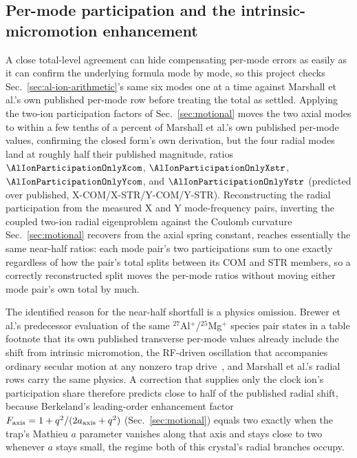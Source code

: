 \documentclass[aps,pra,superscriptaddress,groupedaddress,nofootinbib]{revtex4-2}
\begin{document}
\subsection{Per-mode participation and the intrinsic-micromotion enhancement}
\label{sec:al-ion-participation}

A close total-level agreement can hide compensating per-mode errors as
easily as it can confirm the underlying formula mode by mode, so this
project checks Sec.~\ref{sec:al-ion-arithmetic}'s same six modes one at a
time against Marshall et al.'s own published per-mode row before treating
the total as settled. Applying the two-ion participation factors of
Sec.~\ref{sec:motional} moves the two axial modes to within a few tenths of
a percent of Marshall et al.'s own published per-mode values, confirming
the closed form's own derivation, but the four radial modes land
at roughly half their published magnitude, ratios $\AlIonParticipationOnlyXcom$,
$\AlIonParticipationOnlyXstr$, $\AlIonParticipationOnlyYcom$, and
$\AlIonParticipationOnlyYstr$ (predicted over published, X-COM/X-STR/Y-COM/Y-STR).
Reconstructing the radial participation from the measured X and Y
mode-frequency pairs, inverting the coupled two-ion radial eigenproblem
against the Coulomb curvature Sec.~\ref{sec:motional} recovers from the
axial spring constant, reaches essentially the same near-half ratios: each
mode pair's two participations sum to one exactly regardless of how the
pair's total splits between its COM and STR members, so a correctly
reconstructed split moves the per-mode ratios without moving either mode
pair's own total by much.

The identified reason for the near-half shortfall is a physics omission.
Brewer et al.'s predecessor evaluation of the same $^{27}$Al$^+$/$^{25}$Mg$^+$
species pair states in a table footnote that its own published transverse
per-mode values already include the shift from intrinsic micromotion, the
RF-driven oscillation that accompanies ordinary secular motion at any
nonzero trap drive~\cite{Brewer2019}, and Marshall et al.'s radial rows
carry the same physics. A correction that supplies only the clock ion's
participation share therefore predicts close to half of the published
radial shift, because Berkeland's leading-order enhancement factor
$F_{\rm axis}=1+q^2/(2a_{\rm axis}+q^2)$ (Sec.~\ref{sec:motional}) equals
two exactly when the trap's Mathieu $a$ parameter vanishes along that axis
and stays close to two whenever $a$ stays small, the regime both of this
crystal's radial branches occupy.
\end{document}
